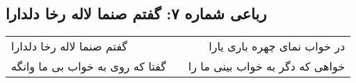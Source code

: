 \begin{center}
\section*{رباعی شماره ۷: گفتم صنما لاله رخا دلدارا}
\label{sec:sh007}
\begin{longtable}{l p{0.5cm} r}
گفتم صنما لاله رخا دلدارا
&&
در خواب نمای چهره باری یارا
\\
گفتا که روی به خواب بی ما وانگه
&&
خواهی که دگر به خواب بینی ما را
\\
\end{longtable}
\end{center}
